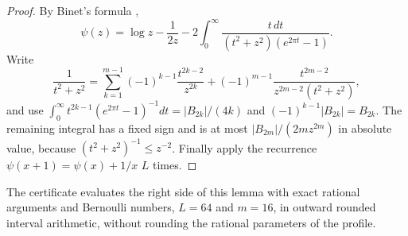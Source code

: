 \begin{proof}
By Binet's formula \cite[Equation~(5.9.15)]{DLMF},
\[
 \psi(z)=\log z-\frac1{2z}
 -2\int_0^\infty\frac{t\,dt}{(t^2+z^2)(e^{2\pi t}-1)} .
\]
Write
\[
 \frac1{t^2+z^2}=\sum_{k=1}^{m-1}(-1)^{k-1}\frac{t^{2k-2}}{z^{2k}}
 +(-1)^{m-1}\frac{t^{2m-2}}{z^{2m-2}(t^2+z^2)},
\]
and use $\int_0^\infty t^{2k-1}(e^{2\pi t}-1)^{-1}dt=|B_{2k}|/(4k)$ and
$(-1)^{k-1}|B_{2k}|=B_{2k}$. The remaining integral has a fixed sign and
is at most $|B_{2m}|/(2mz^{2m})$ in absolute value, because
$(t^2+z^2)^{-1}\le z^{-2}$. Finally apply the recurrence
$\psi(x+1)=\psi(x)+1/x$ $L$ times.
\end{proof}

The certificate evaluates the right side of this lemma with exact
rational arguments and Bernoulli numbers, $L=64$ and $m=16$, in outward
rounded interval arithmetic, without rounding the rational parameters of
the profile.
